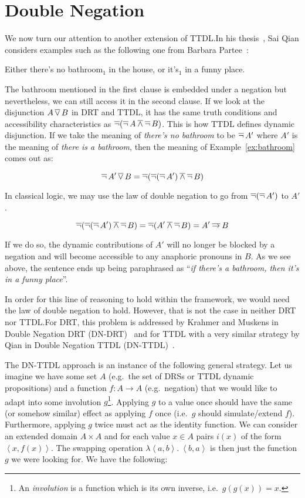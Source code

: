 \section{Double Negation}
\label{sec:double-negation}

We now turn our attention to another extension of TTDL.\@ In his
thesis~\cite{qian2014accessibility}, Sai Qian considers examples such as
the following one from Barbara Partee~\cite{roberts1989modal}:

\begin{exe}
  \ex \label{ex:bathroom} Either there's no bathroom$_1$ in the house, or
  it's$_1$ in a funny place.
\end{exe}

The bathroom mentioned in the first clause is embedded under a negation but
nevertheless, we can still access it in the second clause. If we look at
the disjunction $A \mathop{\overline{\lor}} B$ in DRT and TTDL, it has the same truth
conditions and accessibility characteristics as
$\mathop{\overline{\lnot}} (\mathop{\overline{\lnot}} A \mathbin{\overline{\land}} \mathop{\overline{\lnot}} B)$. This is how TTDL defines dynamic
disjunction. If we take the meaning of \emph{there's no bathroom} to be
$\mathop{\overline{\lnot}} A'$ where $A'$ is the meaning of \emph{there is a bathroom}, then
the meaning of Example~\ref{ex:bathroom} comes out as:

$$
\mathop{\overline{\lnot}} A' \mathop{\overline{\lor}} B = \mathop{\overline{\lnot}} (\mathop{\overline{\lnot}} (\mathop{\overline{\lnot}} A') \mathbin{\overline{\land}} \mathop{\overline{\lnot}} B)
$$

In classical logic, we may use the law of double negation to go from
$\mathop{\overline{\lnot}} (\mathop{\overline{\lnot}} A')$ to $A'$.

$$
\mathop{\overline{\lnot}} (\mathop{\overline{\lnot}} (\mathop{\overline{\lnot}} A') \mathbin{\overline{\land}} \mathop{\overline{\lnot}} B) = \mathop{\overline{\lnot}} (A' \mathbin{\overline{\land}} \mathop{\overline{\lnot}} B) = A' \mathbin{\overline{\to}} B
$$

If we do so, the dynamic contributions of $A'$ will no longer be blocked by
a negation and will become accessible to any anaphoric pronouns in $B$. As
we see above, the sentence ends up being paraphrased as ``\emph{if there's
  a bathroom, then it's in a funny place}''.

In order for this line of reasoning to hold within the framework, we would
need the law of double negation to hold. However, that is not the case in
neither DRT nor TTDL.\@ For DRT, this problem is addressed by Krahmer and
Muskens in Double Negation DRT (DN-DRT)~\cite{krahmer1995negation} and for
TTDL with a very similar strategy by Qian in Double Negation TTDL
(DN-TTDL)~\cite{qian2014accessibility}.

The DN-TTDL approach is an instance of the following general strategy. Let
us imagine we have some set $A$ (e.g.\ the set of DRSs or TTDL dynamic
propositions) and a function $f : A \to A$ (e.g.\ negation) that we would
like to adapt into some involution $g$\footnote{An \emph{involution} is a
  function which is its own inverse, i.e.\ $g(g(x)) = x$.}. Applying $g$ to
a value once should have the same (or somehow similar) effect as applying
$f$ once (i.e.\ $g$ should simulate/extend $f$). Furthermore, applying $g$
twice must act as the identity function. We can consider an extended domain
$A \times A$ and for each value $x \in A$ pairs $i(x)$ of the form
$\left<x, f(x)\right>$. The swapping operation
$\lambda \left<a, b\right>.\ \left<b, a\right>$ is then just the function
$g$ we were looking for. We have the following:

